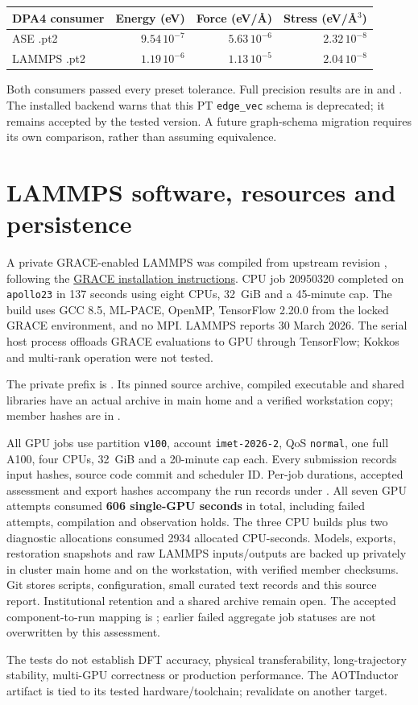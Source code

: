 \documentclass[10pt,a4paper]{article}
\begin{document}
\begin{center}
\begin{tabular}{@{}lrrr@{}}
\toprule
DPA4 consumer & Energy (eV) & Force (eV/\AA) & Stress (eV/\AA$^3$) \\
\midrule
ASE .pt2 & $9.54\,10^{-7}$ & $5.63\,10^{-6}$ & $2.32\,10^{-8}$ \\
LAMMPS .pt2 & $1.19\,10^{-6}$ & $1.13\,10^{-5}$ & $2.04\,10^{-8}$ \\
\bottomrule
\end{tabular}
\end{center}
Both consumers passed every preset tolerance. Full precision results are in
 and
.
The installed backend warns that this PT \texttt{edge\_vec} schema is deprecated;
it remains accepted by the tested version. A future graph-schema migration
requires its own comparison, rather than assuming equivalence.

\section{LAMMPS software, resources and persistence}
A private GRACE-enabled LAMMPS was compiled from upstream revision
, following the
\href{https://gracemaker.readthedocs.io/en/latest/gracemaker/install/}{GRACE installation instructions}.
CPU job 20950320 completed on \texttt{apollo23} in 137 seconds using eight CPUs,
32~GiB and a 45-minute cap. The build uses GCC 8.5, ML-PACE, OpenMP, TensorFlow
2.20.0 from the locked GRACE environment, and no MPI. LAMMPS reports 30 March 2026.
The serial host process offloads GRACE evaluations to GPU through TensorFlow;
Kokkos and multi-rank operation were not tested.

The private prefix is
.
Its pinned source archive, compiled executable and shared libraries have an
actual archive in main home and a verified workstation copy; member hashes are
in .

All GPU jobs use partition \texttt{v100}, account \texttt{imet-2026-2}, QoS
\texttt{normal}, one full A100, four CPUs, 32~GiB and a 20-minute cap each.
Every submission records input hashes, source code commit and scheduler ID.
Per-job durations, accepted assessment and export hashes accompany the run
records under .
All seven GPU attempts consumed \textbf{606 single-GPU seconds} in total,
including failed attempts, compilation and observation holds. The three CPU
builds plus two diagnostic allocations consumed 2934 allocated CPU-seconds.
Models, exports, restoration snapshots and raw LAMMPS inputs/outputs are backed
up privately in cluster main home and on the workstation, with verified member
checksums. Git stores scripts, configuration, small curated text records and
this source report. Institutional retention and a shared archive remain open.
The accepted component-to-run mapping is
; earlier failed aggregate
job statuses are not overwritten by this assessment.

The tests do not establish DFT accuracy, physical transferability, long-trajectory
stability, multi-GPU correctness or production performance. The AOTInductor
artifact is tied to its tested hardware/toolchain; revalidate on another target.
\end{document}
